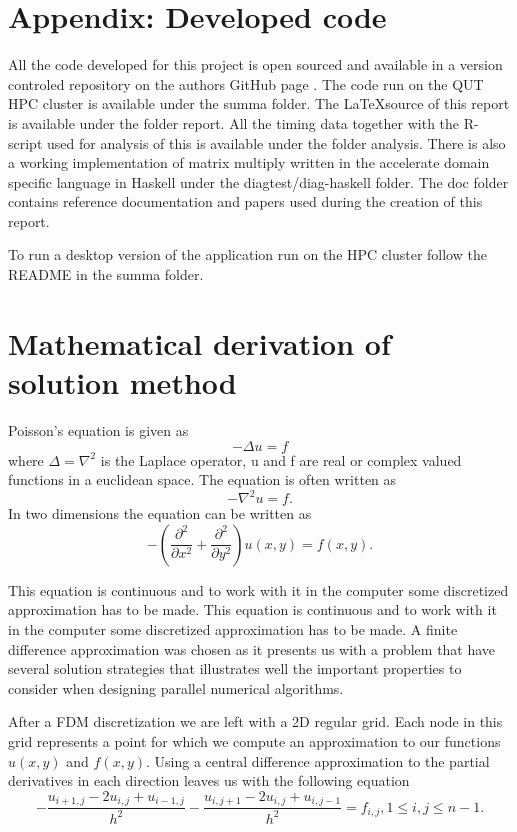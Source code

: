 \documentclass{article}
\newcommand{\dd}[2]{\ensuremath{\frac{\partial^2 #1}{\partial #2^2}}}
\begin{document}
\section{Appendix: Developed code}
All the code developed for this project is open sourced and available
in a version controled repository on the authors GitHub page \cite{github}.
The code run on the QUT HPC cluster is available under the summa folder. The \LaTeX source of this
report is available under the folder report. All the timing data together with the R-script used
for analysis of this is available under the folder analysis. There is also a working implementation of
matrix multiply written in the accelerate domain specific language in Haskell under the diagtest/diag-haskell
folder. The doc folder contains reference documentation and papers used during the creation of this report.
\begin{em}To run a desktop version of the application run on the HPC cluster follow the README in the summa folder.\end{em}

\section{Mathematical derivation of solution method}
\label{sec:math_der}
Poisson's equation is given as
\[
-\Delta u = f
\]
where $\Delta = \nabla^2$ is the Laplace operator, u and f are real or complex valued functions in a
euclidean space. The equation is often written as
\[
-\nabla^2 u = f.
\]
In two dimensions the equation can be written as
\[
-\left( \dd{}{x} + \dd{}{y}\right) u(x,y) = f(x,y).
\]

This equation is continuous and to work with it in the computer some discretized approximation has
to be made. This equation is continuous and to work with it in the computer some discretized approximation has to be made. A finite difference approximation was chosen as it presents us with a
problem that have several solution strategies that illustrates well the important properties to
consider when designing parallel numerical algorithms.

After a FDM discretization we are left with a 2D regular grid. Each node in this grid represents
a point for which we compute an approximation to our functions $u(x,y)$ and $f(x,y)$.
Using a central difference approximation to the partial derivatives in each direction leaves us
with the following equation
\[
-\frac{u_{i+1,j}-2u_{i,j}+u_{i-1,j}}{h^2} - \frac{u_{i,j+1}-2u_{i,j}+u_{i,j-1}}{h^2} = f_{i,j}, 1\leq i,j \leq n-1.
\]
\end{document}
